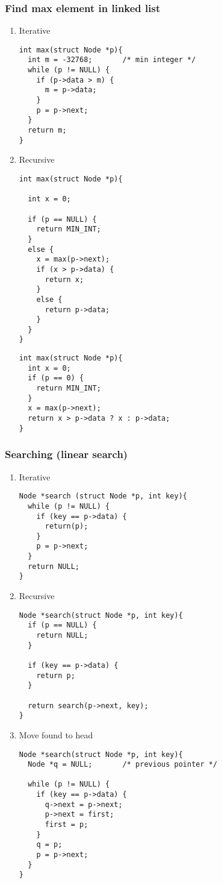 \documentclass[11pt]{article}
\begin{document}
\subsubsection{Find max element in linked list}
\label{sec:orgc144fd7}
\begin{enumerate}
\item Iterative
\label{sec:orgeda1ce8}
\begin{verbatim}
int max(struct Node *p){
  int m = -32768;		/* min integer */
  while (p != NULL) {
    if (p->data > m) {
      m = p->data;
    }
    p = p->next;
  }
  return m;
}
\end{verbatim}
\item Recursive
\label{sec:org25205d1}
\begin{verbatim}
int max(struct Node *p){

  int x = 0;

  if (p == NULL) {
    return MIN_INT;
  }
  else {
    x = max(p->next);
    if (x > p->data) {
      return x;
    }
    else {
      return p->data;
    }
  }
}
\end{verbatim}

\begin{verbatim}
int max(struct Node *p){
  int x = 0;
  if (p == 0) {
    return MIN_INT;
  }
  x = max(p->next);
  return x > p->data ? x : p->data;
}
\end{verbatim}
\end{enumerate}
\subsubsection{Searching (linear search)}
\label{sec:orgdce38ed}
\begin{enumerate}
\item Iterative
\label{sec:org698320f}
\begin{verbatim}
Node *search (struct Node *p, int key){
  while (p != NULL) {
    if (key == p->data) {
      return(p);
    }
    p = p->next;
  }
  return NULL;
}
\end{verbatim}
\item Recursive
\label{sec:org27a09e6}
\begin{verbatim}
Node *search(struct Node *p, int key){
  if (p == NULL) {
    return NULL;
  }

  if (key == p->data) {
    return p;
  }

  return search(p->next, key);
}
\end{verbatim}
\item Move found to head
\label{sec:orged35049}
\begin{verbatim}
Node *search(struct Node *p, int key){
  Node *q = NULL; 		/* previous pointer */

  while (p != NULL) {
    if (key == p->data) {
      q->next = p->next;
      p->next = first;
      first = p;
    }
    q = p;
    p = p->next;
  }
}
\end{verbatim}
\end{enumerate}
\end{document}
